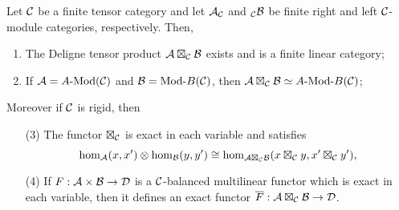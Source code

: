 \documentclass{amsart}
\begin{document}
\begin{theorem} \label{thm:DelignePrdtOverATCExists}
	Let $\mathcal C$ be a finite tensor category and let $\mathcal A_{\mathcal C}$ and ${}_{\mathcal C}\mathcal B$ be finite right and left $\mathcal C$-module categories, respectively. Then,
	\begin{enumerate}
		\item The Deligne tensor product $\mathcal A \boxtimes_{\mathcal C} \mathcal B$ exists and is a finite linear category;
		\item If $\cA = \Mod{A}{}(\cC)$ and $\cB = \Mod{}{B}(\cC)$, then $\cA \boxtimes_{\cC} \cB \simeq \Mod{A }{B}(\cC)$;
	\end{enumerate} 
Moreover if $\mathcal C$ is rigid, then 	
	\begin{enumerate}
		\item[(3)] The functor $\boxtimes_{\mathcal C}$ is exact in each variable and satisfies 
		\begin{equation*}
			\hom_{\mathcal A}(x,x') \otimes \hom_{\mathcal B}(y, y') \cong \hom_{\mathcal A \boxtimes_{\mathcal C} \mathcal B} (x \boxtimes_{\mathcal C} y, x' \boxtimes_{\mathcal C} y'),
		\end{equation*}
		\item[(4)] If $F: \mathcal A \times \mathcal B \to \mathcal D$ is a $\mathcal C$-balanced multilinear functor which is exact in each variable, then it defines an exact functor $\overline{F}: \mathcal A \boxtimes_{\mathcal C} \mathcal B \to \mathcal D$. 
	\end{enumerate} 
\end{theorem}
\end{document}
